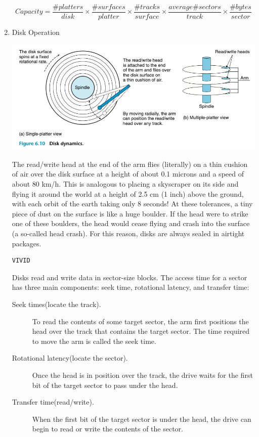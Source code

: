 \documentclass[11pt]{article}
\begin{document}
\begin{enumerate}
\begin{equation}
Capacity = \frac{\#platters}{disk} \times \frac{\#surfaces}{platter} \times \frac{\#tracks}{surface} \times \frac{average \#sectors}{track} \times \frac{\#bytes}{sector}
\end{equation}


\item Disk Operation
\label{sec:orgf720062}

\begin{center}
\includegraphics[width=.9\linewidth]{pics/figure6.10-disk-dynamics.png}
\end{center}

The read/write head at the end of the arm flies (literally) on a thin cushion of air over the disk surface at a height of about 0.1 microns and a speed of about 80 km/h. This is analogous to placing a skyscraper on its side and flying it around the world at a height of 2.5 cm (1 inch) above the ground, with each orbit of the earth taking only 8 seconds! At these tolerances, a tiny piece of dust on the surface is like a huge boulder. If the head were to strike one of these boulders, the head would cease flying and crash into the surface (a so-called head crash). For this reason, disks are always sealed in airtight packages.\\

\begin{verbatim}
VIVID
\end{verbatim}


Disks read and write data in sector-size blocks. The access time for a sector has three main components: seek time, rotational latency, and transfer time:\\
\begin{description}
\item[{Seek times(locate the track).}] To read the contents of some target sector, the arm first positions the head over the track that contains the target sector. The time required to move the arm is called the seek time.\\
\item[{Rotational latency(locate the sector).}] Once the head is in position over the track, the drive waits for the first bit of the target sector to pass under the head.\\
\item[{Transfer time(read/write).}] When the first bit of the target sector is under the head, the drive can begin to read or write the contents of the sector.\\
\end{description}



\end{enumerate}
\end{document}
